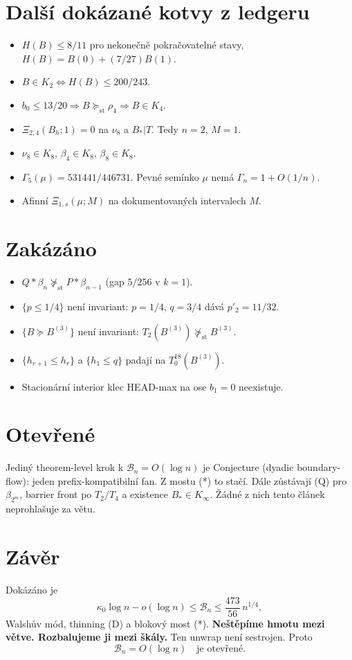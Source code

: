 \documentclass[11pt,a4paper]{article}
\theoremstyle{definition}
\theoremstyle{remark}
\theoremstyle{plain}
\begin{document}
\section{Další dokázané kotvy z ledgeru}

\begin{itemize}
\item $H(B)\le 8/11$ pro nekonečně pokračovatelné stavy,
$H(B)=B(0)+(7/27)B(1)$.
\item $B\in K_2\iff H(B)\le 200/243$.
\item $b_0\le 13/20\Rightarrow B\succeq_{\mathrm{st}}\rho_4\Rightarrow B\in K_4$.
\item $\Xi_{2,4}(B_h;1)=0$ na $\nu_8$ a $B_*|T$. Tedy $n=2$, $M=1$.
\item $\nu_8\in K_8$, $\beta_4\in K_8$, $\beta_8\in K_8$.
\item $\Gamma_5(\mu)=531441/446731$. Pevné semínko $\mu$ nemá
$\Gamma_n=1+O(1/n)$.
\item Afinní $\Xi_{1,s}(\mu;M)$ na dokumentovaných intervalech $M$.
\end{itemize}

\section{Zakázáno}

\begin{itemize}
\item $Q*\beta_n\not\succeq_{\mathrm{st}}P*\beta_{n-1}$ (gap $5/256$ v $k=1$).
\item $\{p\le 1/4\}$ není invariant: $p=1/4$, $q=3/4$ dává $p'_2=11/32$.
\item $\{B\succeq B^{(3)}\}$ není invariant: $T_2(B^{(3)})\not\succeq_{\mathrm{st}}B^{(3)}$.
\item $\{h_{r+1}\le h_r\}$ a $\{h_1\le q\}$ padají na $T_0^{18}(B^{(3)})$.
\item Stacionární interior klec HEAD-max na ose $b_1=0$ neexistuje.
\end{itemize}

\section{Otevřené}

Jediný theorem-level krok k $\mathcal B_n=O(\log n)$ je Conjecture
(dyadic boundary-flow): jeden prefix-kompatibilní fan. Z mostu (*) to
stačí. Dále zůstávají (Q) pro $\beta_{2^m}$, barrier front po $T_2/T_4$
a existence $B_*\in K_\infty$. Žádné z nich tento článek neprohlašuje
za větu.

\section{Závěr}

Dokázáno je
\[
\kappa_0\log n-o(\log n)
\le\mathcal B_n
\le\frac{473}{56}\,n^{1/4},
\]
Walshův mód, thinning (D) a blokový most (*).
\textbf{Neštěpíme hmotu mezi větve. Rozbalujeme ji mezi škály.}
Ten unwrap není sestrojen. Proto
\[
\boxed{\mathcal B_n=O(\log n)\quad\text{je otevřené.}}
\]
\end{document}

